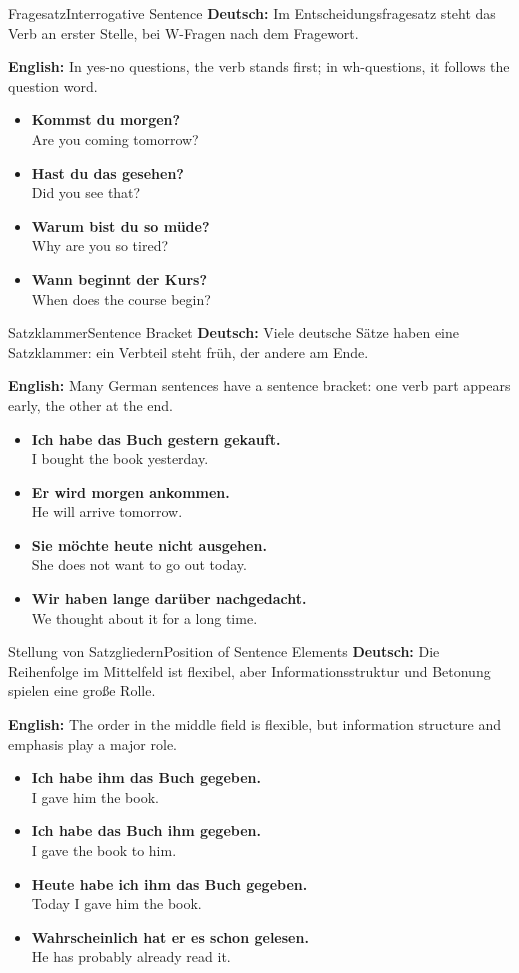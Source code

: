 \documentclass[a4paper,11pt]{article}
\newcommand{\GermanText}[1]{\textbf{Deutsch: }#1\par}
\newcommand{\EnglishText}[1]{{\color{SoftGray}\textbf{English: }#1\par}}
\newcommand{\ExampleItem}[2]{\item \textbf{#1}\\{\color{SoftGray}#2}}
\begin{document}
\begin{grammarentry}{Fragesatz}{Interrogative Sentence}
    \GermanText{Im Entscheidungsfragesatz steht das Verb an erster Stelle, bei W-Fragen nach dem Fragewort.}
    \EnglishText{In yes-no questions, the verb stands first; in wh-questions, it follows the question word.}
    \begin{exbox}
        \begin{itemize}
            \ExampleItem{Kommst du morgen?}{Are you coming tomorrow?}
            \ExampleItem{Hast du das gesehen?}{Did you see that?}
            \ExampleItem{Warum bist du so müde?}{Why are you so tired?}
            \ExampleItem{Wann beginnt der Kurs?}{When does the course begin?}
        \end{itemize}
    \end{exbox}
\end{grammarentry}

\begin{grammarentry}{Satzklammer}{Sentence Bracket}
    \GermanText{Viele deutsche Sätze haben eine Satzklammer: ein Verbteil steht früh, der andere am Ende.}
    \EnglishText{Many German sentences have a sentence bracket: one verb part appears early, the other at the end.}
    \begin{exbox}
        \begin{itemize}
            \ExampleItem{Ich habe das Buch gestern gekauft.}{I bought the book yesterday.}
            \ExampleItem{Er wird morgen ankommen.}{He will arrive tomorrow.}
            \ExampleItem{Sie möchte heute nicht ausgehen.}{She does not want to go out today.}
            \ExampleItem{Wir haben lange darüber nachgedacht.}{We thought about it for a long time.}
        \end{itemize}
    \end{exbox}
\end{grammarentry}

\begin{grammarentry}{Stellung von Satzgliedern}{Position of Sentence Elements}
    \GermanText{Die Reihenfolge im Mittelfeld ist flexibel, aber Informationsstruktur und Betonung spielen eine große Rolle.}
    \EnglishText{The order in the middle field is flexible, but information structure and emphasis play a major role.}
    \begin{exbox}
        \begin{itemize}
            \ExampleItem{Ich habe ihm das Buch gegeben.}{I gave him the book.}
            \ExampleItem{Ich habe das Buch ihm gegeben.}{I gave the book to him.}
            \ExampleItem{Heute habe ich ihm das Buch gegeben.}{Today I gave him the book.}
            \ExampleItem{Wahrscheinlich hat er es schon gelesen.}{He has probably already read it.}
        \end{itemize}
    \end{exbox}
\end{grammarentry}
\end{document}

